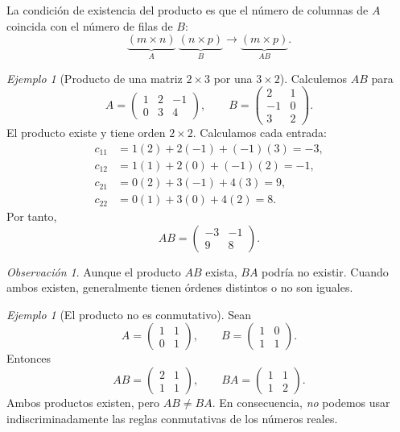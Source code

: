 \documentclass[12pt]{article}
\theoremstyle{remark}
\newtheorem{observacion}[definicion]{Observación}
\newtheorem{ejemplo}[definicion]{Ejemplo}
\begin{document}
La condición de existencia del producto es que el número de columnas de $A$ coincida con el número de filas de $B$:
\[
\underbrace{(m\times n)}_A\ \underbrace{(n\times p)}_B
\longrightarrow\underbrace{(m\times p)}_{AB}.
\]

\begin{ejemplo}[Producto de una matriz $2\times3$ por una $3\times2$]
Calculemos $AB$ para
\[
A=\begin{pmatrix}1&2&-1\\0&3&4\end{pmatrix},\qquad
B=\begin{pmatrix}2&1\\-1&0\\3&2\end{pmatrix}.
\]
El producto existe y tiene orden $2\times2$. Calculamos cada entrada:
\begin{align*}
c_{11}&=1(2)+2(-1)+(-1)(3)=-3,\\
c_{12}&=1(1)+2(0)+(-1)(2)=-1,\\
c_{21}&=0(2)+3(-1)+4(3)=9,\\
c_{22}&=0(1)+3(0)+4(2)=8.
\end{align*}
Por tanto,
\[\boxed{AB=\begin{pmatrix}-3&-1\\9&8\end{pmatrix}.}\]
\end{ejemplo}

\begin{observacion}
Aunque el producto $AB$ exista, $BA$ podría no existir. Cuando ambos existen, generalmente tienen órdenes distintos o no son iguales.
\end{observacion}

\begin{ejemplo}[El producto no es conmutativo]
Sean
\[
A=\begin{pmatrix}1&1\\0&1\end{pmatrix},\qquad
B=\begin{pmatrix}1&0\\1&1\end{pmatrix}.
\]
Entonces
\[
AB=\begin{pmatrix}2&1\\1&1\end{pmatrix},\qquad
BA=\begin{pmatrix}1&1\\1&2\end{pmatrix}.
\]
Ambos productos existen, pero $AB\ne BA$. En consecuencia, \emph{no} podemos usar indiscriminadamente las reglas conmutativas de los números reales.
\end{ejemplo}
\end{document}
